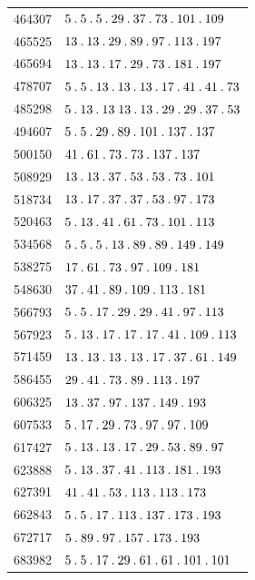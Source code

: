 \begin{longtable}{@{}r|l@{}}
464307 & $5\pdot 5\pdot 5\pdot 29\pdot 37\pdot 73\pdot 101\pdot 109$\\
465525 & $13\pdot 13\pdot 29\pdot 89\pdot 97\pdot 113\pdot 197$\\
465694 & $13\pdot 13\pdot 17\pdot 29\pdot 73\pdot 181\pdot 197$\\
478707 & $5\pdot 5\pdot 13\pdot 13\pdot 13\pdot 17\pdot 41\pdot 41\pdot 73$\\
485298 & $5\pdot 13\pdot 13\;13\pdot 13\pdot 29\pdot 29\pdot 37\pdot 53$\\
494607 & $5\pdot 5\pdot 29\pdot 89\pdot 101\pdot 137\pdot 137$\\
500150 & $41\pdot 61\pdot 73\pdot 73\pdot 137\pdot 137$\\
508929 & $13\pdot 13\pdot 37\pdot 53\pdot 53\pdot 73\pdot 101$\\
518734 & $13\pdot 17\pdot 37\pdot 37\pdot 53\pdot 97\pdot 173$\\
520463 & $5\pdot 13\pdot 41\pdot 61\pdot 73\pdot 101\pdot 113$\\
534568 & $5\pdot 5\pdot 5\pdot 13\pdot 89\pdot 89\pdot 149\pdot 149$\\
538275 & $17\pdot 61\pdot 73\pdot 97\pdot 109\pdot 181$\\
548630 & $37\pdot 41\pdot 89\pdot 109\pdot 113\pdot 181$\\
566793 & $5\pdot 5\pdot 17\pdot 29\pdot 29\pdot 41\pdot 97\pdot 113$\\
567923 & $5\pdot 13\pdot 17\pdot 17\pdot 17\pdot 41\pdot 109\pdot 113$\\
571459 & $13\pdot 13\pdot 13\pdot 13\pdot 17\pdot 37\pdot 61\pdot 149$\\
586455 & $29\pdot 41\pdot 73\pdot 89\pdot 113\pdot 197$\\
606325 & $13\pdot 37\pdot 97\pdot 137\pdot 149\pdot 193$\\
607533 & $5\pdot 17\pdot 29\pdot 73\pdot 97\pdot 97\pdot 109$\\
617427 & $5\pdot 13\pdot 13\pdot 17\pdot 29\pdot 53\pdot 89\pdot 97$\\
623888 & $5\pdot 13\pdot 37\pdot 41\pdot 113\pdot 181\pdot 193$\\
627391 & $41\pdot 41\pdot 53\pdot 113\pdot 113\pdot 173$\\
662843 & $5\pdot 5\pdot 17\pdot 113\pdot 137\pdot 173\pdot 193$\\
672717 & $5\pdot 89\pdot 97\pdot 157\pdot 173\pdot 193$\\
683982 & $5\pdot 5\pdot 17\pdot 29\pdot 61\pdot 61\pdot 101\pdot 101$\\

\end{longtable}
